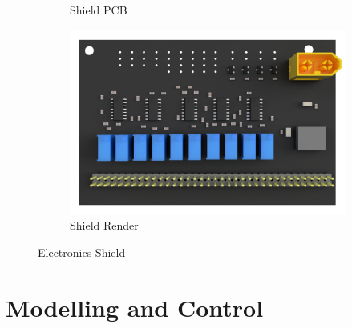 \documentclass[11pt,a4paper]{article}
\begin{document}
\begin{figure}[!hbt]
\begin{subfigure}[t]{0.45\textwidth}
        \caption{Shield PCB}
        \label{fig:shield_PCB}
    \end{subfigure}
    \begin{subfigure}[t]{0.45\textwidth}
        \centering
        \includegraphics[angle=90, origin=c, clip, trim=1.5cm 0cm 1.5cm 0cm, width=1.00\textwidth]{Shield_Render.png}
        \caption{Shield Render}
        \label{fig:shield_render}
    \end{subfigure}
    \caption{Electronics Shield}
    \label{fig:shield}
\end{figure}

\clearpage
\section{Modelling and Control}
\label{section:modeling_and_control}
\end{document}

